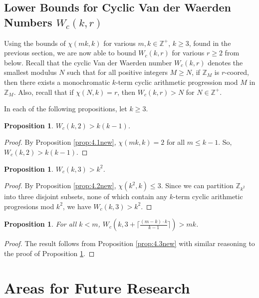 \documentclass{article}
\newtheorem{proposition}[theorem]{Proposition}
\theoremstyle{definition}
\theoremstyle{remark}
\begin{document}
\subsection{Lower Bounds for Cyclic Van der Waerden Numbers $W_{c}(k,r)$}

Using the bounds of $\chi(mk,k)$ for various $m,k \in \mathbb{Z}^+$, $k \geq 3$, found in the previous section, we are now able to bound $W_{c}(k,r)$ for various $r \geq 2$ from below. Recall that the cyclic Van der Waerden number $W_{c}(k,r)$ denotes the smallest modulus $N$ such that for all positive integers $M \geq N$, if $\mathbb{Z}_{M}$ is $r$-coored, then there exists a monochromatic $k$-term cyclic arithmetic progression mod $M$ in $\mathbb{Z}_{M}$. Also, recall that if $\chi(N,k) = r$, then $W_{c}(k,r) > N$ for $N \in \mathbb{Z}^+$.

In each of the following propositions, let $k \geq 3$.

\begin{proposition}
    $W_c(k,2) > k(k-1)$.
\end{proposition}

\begin{proof}
    By Proposition \ref{prop:4.1new}, $\chi(mk,k) = 2$ for all $m \leq k-1$. So, $W_{c}(k,2) > k(k-1)$.
\end{proof}

\begin{proposition}\label{prop:finalneed}
    $W_c(k,3) > k^2$.
\end{proposition}

\begin{proof}
    By Proposition \ref{prop:4.2new}, $\chi(k^2,k) \leq 3$. Since we can partition $\mathbb{Z}_{k^2}$ into three disjoint subsets, none of which contain any $k$-term cyclic arithmetic progresions mod $k^2$, we have $W_{c}(k,3) > k^2$.
\end{proof}

\begin{proposition}
    For all $k < m$, $W_c(k,3+\lceil\frac{(m-k)\cdot k}{k-1}\rceil) > mk$.
\end{proposition}

\begin{proof}
    The result follows from Proposition \ref{prop:4.3new} with similar reasoning to the proof of Proposition \ref{prop:finalneed}.
\end{proof}

\section{Areas for Future Research}\label{sec:future}
\end{document}
